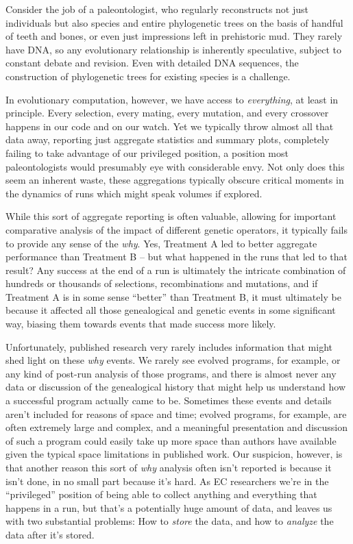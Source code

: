 Consider the job of a paleontologist, who regularly reconstructs not just individuals but also
species and entire phylogenetic trees on the basis of handful of teeth and bones, or even just
impressions left in prehistoric mud. They rarely have DNA, so any evolutionary relationship is
inherently speculative, subject to constant debate and revision. Even with detailed DNA sequences,
the construction of phylogenetic trees for existing species is a challenge.

In evolutionary computation, however, we have access to \emph{everything}, at least in principle. Every
selection, every mating, every mutation, and every crossover happens in our code and on our watch.
Yet we typically throw almost all that data away, reporting just aggregate statistics and summary
plots, completely failing to take advantage of our privileged position, a position most 
paleontologists would presumably eye with considerable envy. Not only does this seem an inherent
waste, these aggregations typically obscure critical moments in the dynamics of runs which might
speak volumes if explored.

While this sort of aggregate reporting is often valuable, allowing for important comparative
analysis of the impact of different genetic operators, it typically fails to provide
any sense of the \emph{why}. Yes, Treatment A led to better aggregate performance than 
Treatment B -- but what happened in the runs that led to that result? Any success at the end of a
run is ultimately the intricate combination of hundreds or thousands of selections, recombinations
and mutations, and if Treatment A is in some sense ``better'' than Treatment B, it must ultimately
be because it affected all those genealogical and genetic events in some significant way, biasing them
towards events that made success more likely.

Unfortunately, published research very rarely includes information that might shed light on 
these \emph{why} events. We rarely see evolved programs, for example, or any kind of post-run analysis
of those programs, and there is almost never any data or discussion of the genealogical history that
might help us understand how a successful program actually came to be. 
Sometimes these events and details aren't included
for reasons of space and time; evolved programs, for example, are often extremely large and complex,
and a meaningful presentation and discussion of such a program could easily take up more space than
authors have available given the typical space limitations in published work.
Our suspicion, however, is that another reason this sort of \emph{why} analysis often isn't 
reported is because it isn't done, in no small part because it's hard. As EC researchers we're in the
``privileged'' position of being able to collect anything and everything that happens in a run, 
but that's a potentially huge amount of data, and leaves us with two substantial problems: 
How to \emph{store} the data, and how to \emph{analyze} the data
after it's stored. 

